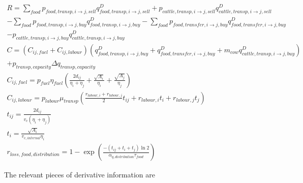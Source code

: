 \documentclass[letter,12pt]{article}
\begin{document}
\begin{gather}
R = \sum_{food} p_{food,transp,i\rightarrow j,sell} q_{food,transp,i \rightarrow j,sell}^D + p_{cattle,transp,i \rightarrow j,sell} q_{cattle,transp,i \rightarrow j,sell}^D \nonumber \\
- \sum_{food} p_{food,transp,i \rightarrow j,buy} q_{food,transp,i \rightarrow j,buy}^D - \sum_{food} p_{food,transfer,i \rightarrow j,buy} q_{food,transfer,i \rightarrow j,buy}^D \nonumber \\
- p_{cattle,transp,i \rightarrow j,buy} q_{cattle,transp,i \rightarrow j,buy}^D \\
C = \left(C_{ij,fuel} + C_{ij,labour}\right)\left( q_{food,transp,i\rightarrow j,buy}^D + q_{food,transfer,i\rightarrow j,buy}^D + m_{cow} q_{cattle,transp,i\rightarrow j,buy}^D\right) \nonumber \\ + p_{transp,capacity} \Delta q_{transp,capacity} \\
C_{ij,fuel} = p_{fuel} \eta_{fuel} \left(\frac{2d_{ij}}{\eta_i + \eta_j} + \frac{\sqrt{A_i}}{\eta_{i}} + \frac{\sqrt{A_j}}{\eta_{j}} \right) \\
C_{ij,labour} = p_{labour} \mu_{transp} \left( \frac{r_{labour,i} + r_{labour,j}}{2}t_{ij} + r_{labour,i}t_i + r_{labour,j}t_j \right) \\
t_{ij} = \frac{2d_{ij}}{v_c \left(\eta_i + \eta_j\right)} \\
t_i = \frac{\sqrt{A_i}}{v_{c,internal} \eta_i} \\
r_{loss,food,distribution} = 1 - \exp \left( \frac{- \left(t_{ij} + t_i + t_j\right) \ln 2}{\alpha_{q,distribution} \tau_{food}}\right)
\end{gather}

The relevant pieces of derivative information are
\end{document}
